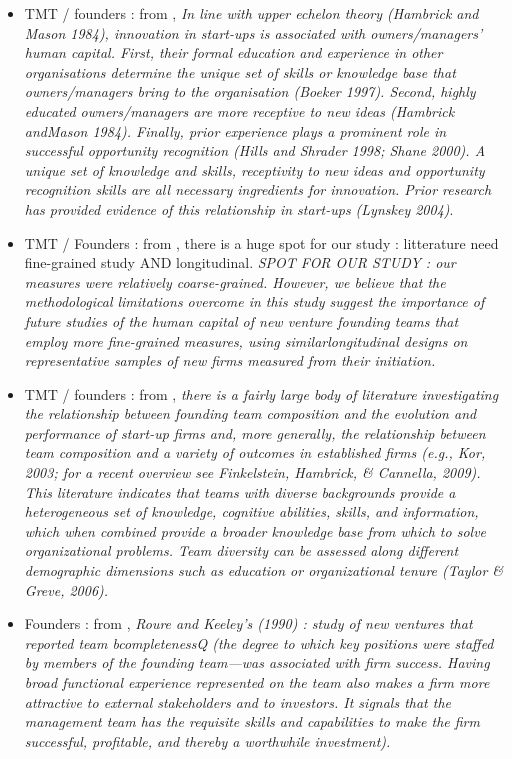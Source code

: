\begin{itemize}
  \item TMT / founders : from \citep{de2010interrelationships}, \textit{In line with upper echelon theory (Hambrick and Mason 1984), innovation in start-ups is associated with owners/managers’ human capital. First, their formal education and experience in other organisations determine the unique set of skills or knowledge base that owners/managers bring to the organisation (Boeker 1997). Second, highly educated owners/managers are more receptive to new ideas (Hambrick andMason 1984). Finally, prior experience plays a prominent role in successful opportunity recognition (Hills and Shrader 1998; Shane 2000). A unique set of knowledge and skills, receptivity to new ideas and opportunity recognition skills are all necessary ingredients for innovation. Prior research has provided evidence of this relationship in start-ups (Lynskey 2004)}.\\

  \item TMT / Founders : from \citet{delmar2006does}, there is a huge spot for our study : litterature need fine-grained study AND longitudinal. \textit{SPOT FOR OUR STUDY : our measures were relatively coarse-grained. However, we believe that the methodological limitations overcome in this study suggest the importance of future studies of the human capital of new venture founding teams that employ more fine-grained measures, using similarlongitudinal designs on representative samples of new firms measured from their initiation.}

  \item TMT / founders : from \citep{gruber2012minds}, \textit{there is a fairly large body of literature investigating the relationship between founding team composition and the evolution and performance of start-up firms and, more generally, the relationship between team composition and a variety of outcomes in established firms (e.g., Kor, 2003; for a recent overview see Finkelstein, Hambrick, & Cannella, 2009). This literature indicates that teams with diverse backgrounds provide a heterogeneous set of knowledge, cognitive abilities, skills, and information, which when combined provide a broader knowledge base from which to solve organizational problems. Team diversity can be assessed along different demographic dimensions such as education or organizational tenure (Taylor & Greve, 2006).}\\

  \item Founders : from \citet{beckman2007early}, \textit{Roure and Keeley’s (1990) : study of new ventures that reported team bcompletenessQ (the degree to which key positions were staffed by members of the founding team—was associated with firm success. Having broad functional experience represented on the team also makes a firm more attractive to external stakeholders and to investors. It signals that the management team has the requisite skills and capabilities to make the firm successful, profitable, and thereby a worthwhile investment).}


\end{itemize}
